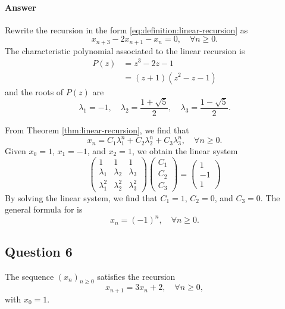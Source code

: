 \paragraph{Answer}
Rewrite the recursion in the form \eqref{eq:definition:linear-recursion} as
\begin{equation*}
    x_{n + 3} - 2 x_{n + 1} - x_n = 0, \quad \forall n \geq 0.
\end{equation*}
The characteristic polynomial associated to the linear recursion is
\begin{align*}
    P(z) &= z^3 - 2z - 1 \\
         &= (z + 1)(z^2 - z - 1)
\end{align*}
and the roots of $ P(z) $ are
\begin{equation*}
    \lambda_1 = -1, \quad \lambda_2 = \frac{1 + \sqrt{5}}{2}, \quad
        \lambda_3 = \frac{1 - \sqrt{5}}{2}.
\end{equation*}

From Theorem \ref{thm:linear-recursion}, we find that
\begin{equation*}
    x_n = C_1 \lambda_1^n + C_2 \lambda_2^n + C_3 \lambda_3^n, \quad
        \forall n \geq 0.
\end{equation*}
Given $ x_0 = 1 $, $ x_1 = -1 $, and $ x_2 = 1 $, we obtain the linear system
\begin{equation*}
    \begin{pmatrix}
        1 & 1 & 1 \\
        \lambda_1 & \lambda_2 & \lambda_3 \\
        \lambda_1^2 & \lambda_2^2 & \lambda_3^2
    \end{pmatrix}
    \begin{pmatrix}
        C_1 \\
        C_2 \\
        C_3
    \end{pmatrix}
    =
    \begin{pmatrix}
        1 \\
        -1 \\
        1
    \end{pmatrix}
\end{equation*}
By solving the linear system, we find that $ C_1 = 1 $, $ C_2 = 0 $, and
    $ C_3 = 0 $.
The general formula for is
\begin{equation*}
    x_n = (-1)^n, \quad \forall n \geq 0.
\end{equation*}

\subsection{Question 6}
The sequence $ (x_n)_{n \geq 0} $ satisfies the recursion
\begin{equation*}
    x_{n + 1} = 3 x_n + 2, \quad \forall n \geq 0,
\end{equation*}
with $ x_0 = 1 $.

